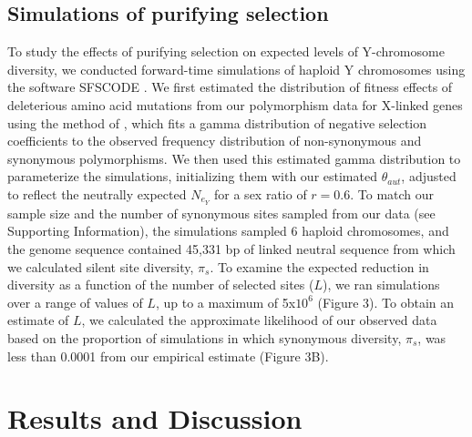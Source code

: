 \documentclass[9pt,twocolumn,twoside,lineno]{gsajnl}
\begin{document}
\subsection*{Simulations of purifying selection}
To study the effects of purifying selection on expected levels of Y-chromosome diversity, we conducted forward-time simulations of haploid Y chromosomes using the software SFSCODE \citep{hernandez2008flexible}. We first estimated the distribution of fitness effects of deleterious amino acid mutations from our polymorphism data for X-linked genes using the method of \citet*{keightley2007joint}, which fits a gamma distribution of negative selection coefficients to the observed frequency distribution of non-synonymous and synonymous polymorphisms. We then used this estimated gamma distribution to parameterize the simulations, initializing them with our estimated $\theta_{aut}$, adjusted to reflect the neutrally expected $N_{e_{Y}}$ for a sex ratio of $r = 0.6$. To match our sample size and the number of synonymous sites sampled from our data (see Supporting Information), the simulations sampled 6 haploid chromosomes, and the genome sequence contained 45,331 bp of linked neutral sequence from which we calculated silent site diversity, $\pi_{s}$. To examine the expected reduction in diversity as a function of the number of selected sites ($L$), we ran simulations over a range of values of $L$, up to a maximum of 5x$10^{6}$ (Figure 3). To obtain an estimate of $L$, we calculated the approximate likelihood of our observed data based on the proportion of simulations in which synonymous diversity, $\pi_{s}$, was less than 0.0001 from our empirical estimate (Figure 3B).

\section*{Results and Discussion}
\end{document}
